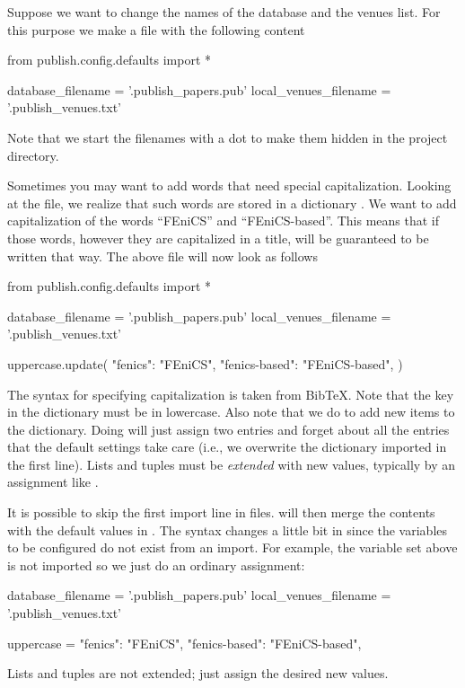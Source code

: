 Suppose we want to change the names of the database and the venues list.
For this purpose
we make a  file with the following content

\begin{code}
from publish.config.defaults import *

database_filename = '.publish_papers.pub'
local_venues_filename = '.publish_venues.txt'
\end{code}
Note that we start the filenames with a dot to make them hidden in
the project directory.

Sometimes you may want to add words that need special capitalization.
Looking at the  file, we realize that
such words are stored in a dictionary . We want to
add capitalization of the words ``FEniCS'' and ``FEniCS-based''.
This means that if those words, however they are capitalized in a title,
will be guaranteed to be written that way. The above file will
now look as follows

\begin{code}
from publish.config.defaults import *

database_filename = '.publish_papers.pub'
local_venues_filename = '.publish_venues.txt'

uppercase.update({
    "fenics": "{FEniCS}",
    "fenics-based": "{FEniCS}-based",
    })
\end{code}
The syntax for specifying capitalization is taken from BibTeX. Note
that the key in the  dictionary must be in lowercase.
Also note that we do  to add new items to
the dictionary. Doing  will just assign two
entries and forget about all the entries that the default settings take
care (i.e., we overwrite the  dictionary imported in
the first line). Lists and tuples must be \emph{extended} with new
values, typically by an assignment like .

It is possible to skip the first import line in 
files. \package{} will then merge the 
contents with the default values in .
The syntax changes a little bit in  since
the variables to be configured do not exist from an import. For example,
the  variable set above is not imported so we just do
an ordinary assignment:

\begin{code}
database_filename = '.publish_papers.pub'
local_venues_filename = '.publish_venues.txt'

uppercase = {
    "fenics": "{FEniCS}",
    "fenics-based": "{FEniCS}-based",
    }
\end{code}
Lists and tuples are not extended; just assign the desired new values.

